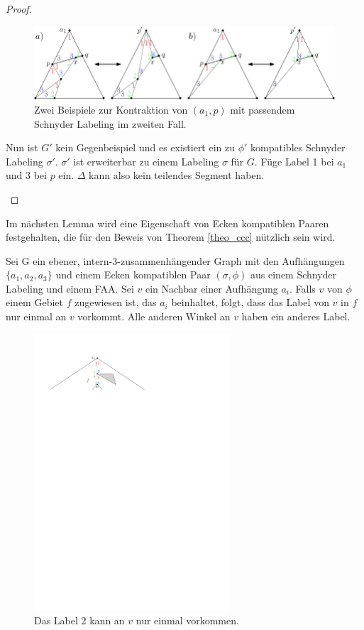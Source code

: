 \begin{proof}
\begin{description}[leftmargin =0pt, font = \rmfamily ]
\begin{figure}
	\centering
	  \includegraphics[width=1\textwidth]{lem3_2.png}
    	\caption{Zwei Beispiele zur Kontraktion von $(a_1,p)$ mit passendem Schnyder Labeling im zweiten Fall.}
    	\label{pic_lem3_2}
\end{figure}

Nun ist $G'$ kein Gegenbeispiel und es existiert ein zu $\phi'$ kompatibles Schnyder Labeling $\sigma'$. $\sigma'$ ist erweiterbar zu einem Labeling $\sigma$ für $G$. Füge Label 1 bei $a_1$ und 3 bei $p$ ein. $\Delta$ kann also kein teilendes Segment haben.
\end{description}
\end{proof}

Im nächsten Lemma wird eine Eigenschaft von Ecken kompatiblen Paaren festgehalten, die für den Beweis von Theorem \ref{theo_ccc} nützlich sein wird.

\begin{lemma}\label{lem4}
Sei G ein ebener, intern-3-zusammenhängender Graph mit den Aufhängungen $\{a_1,a_2,a_3\}$ und einem Ecken kompatiblen Paar $(\sigma,\phi)$ aus einem Schnyder Labeling und einem FAA. Sei $v$ ein Nachbar einer Aufhängung $a_i$. Falls $v$ von $\phi$ einem Gebiet $f$ zugewiesen ist, das $a_i$ beinhaltet, folgt, dass das Label von $v$ in $f$ nur einmal an $v$ vorkommt. Alle anderen Winkel an $v$ haben ein anderes Label.
\end{lemma}

\begin{figure}[h]
\centering
\includegraphics[width=0.65\textwidth]{lem4.pdf}
\caption{Das Label 2 kann an $v$ nur einmal vorkommen.}
\label{lem4}
\centering
\end{figure}

